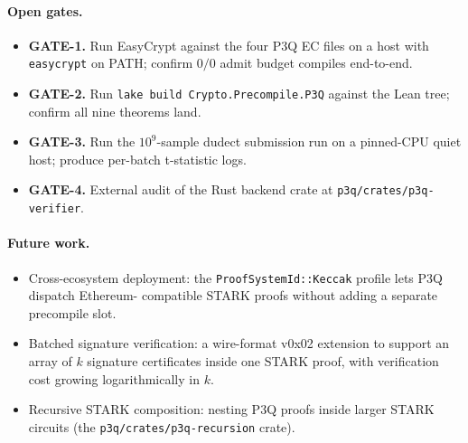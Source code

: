 \documentclass[11pt,a4paper]{article}
\begin{document}
\paragraph{Open gates.}
\begin{itemize}
\item \textbf{GATE-1.} Run EasyCrypt against the four P3Q EC files on
a host with \texttt{easycrypt} on PATH; confirm $0/0$ admit budget
compiles end-to-end.
\item \textbf{GATE-2.} Run \texttt{lake build Crypto.Precompile.P3Q}
against the Lean tree; confirm all nine theorems land.
\item \textbf{GATE-3.} Run the $10^9$-sample dudect submission run on
a pinned-CPU quiet host; produce per-batch t-statistic logs.
\item \textbf{GATE-4.} External audit of the Rust backend crate at
\texttt{p3q/crates/p3q-verifier}.
\end{itemize}

\paragraph{Future work.}
\begin{itemize}
\item Cross-ecosystem deployment: the
\texttt{ProofSystemId::Keccak} profile lets P3Q dispatch Ethereum-
compatible STARK proofs without adding a separate precompile slot.
\item Batched signature verification: a wire-format v0x02 extension
to support an array of $k$ signature certificates inside one STARK
proof, with verification cost growing logarithmically in $k$.
\item Recursive STARK composition: nesting P3Q proofs inside larger
STARK circuits (the \texttt{p3q/crates/p3q-recursion} crate).
\end{itemize}
\end{document}
